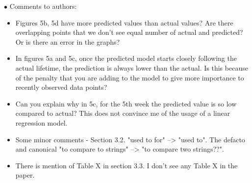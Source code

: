 \documentclass[a4paper, 12pt]{article}
\begin{document}
\begin{center}
\noindent$\bullet$ Comments to authors:
\begin{itemize}
\item Figures 5b, 5d have more predicted values than actual values? Are there overlapping points that we don't see equal number of actual and predicted? Or is there an error in the graphs?
\item In figures 5a and 5c, once the predicted model starts closely following the actual lifetime, the prediction is always lower than the actual. Is this because of the penalty that you are adding to the model to give more importance to recently observed data points?
\item Can you explain why in 5c, for the 5th week the predicted value is so low compared to actual? This does not convince me of the usage of a linear regression model.
\item Some minor comments - Section 3.2. "used to for" --> "used to". The defacto and canonical "to compare to strings" --> "to compare two strings??". 
\item There is mention of Table X in section 3.3. I don't see any Table X in the paper.

\end{itemize}
\end{center}
\end{document}
